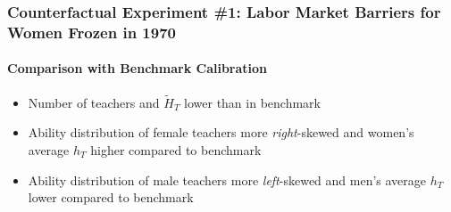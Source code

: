 \documentclass[11pt,hyperref={bookmarks=false},table,aspectratio=169]{beamer}
\begin{document}
%

\begin{frame}
\frametitle{Counterfactual Experiment \#1: Labor Market Barriers for Women Frozen in 1970}
\framesubtitle{Comparison with Benchmark Calibration}
\begin{itemize}
  \item Number of teachers and $\widetilde{H}_T$ lower than in benchmark
  \item Ability distribution of female teachers more {\it right}-skewed and women's average $h_T$ higher compared to benchmark
  \item Ability distribution of male teachers more {\it left}-skewed and men's average $h_T$ lower compared to benchmark
\end{itemize}
\end{frame}
\end{document}
